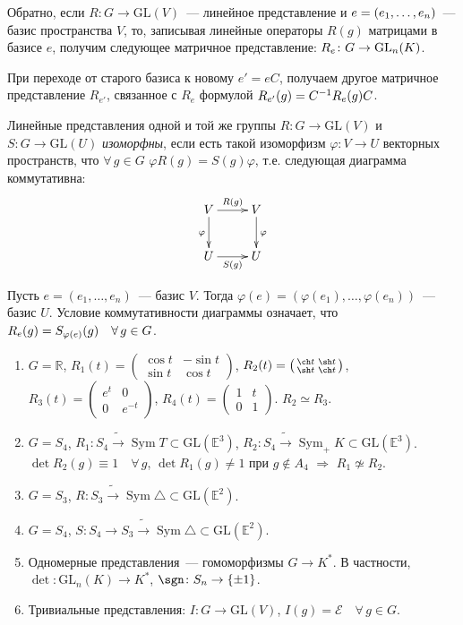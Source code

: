 \documentclass[a4paper]{article}
\newcommand{\Sym}{\mathop{\mathrm{Sym}}\nolimits}
\newcommand*{\p}[1]{#1\nobreak\discretionary{}{\hbox{$\mathsurround=0pt #1$}}{}}
\begin{document}
Обратно, если $R\colon G\to \mathrm{GL}(V)$~--- линейное
представление и $e=(e_1,\p\ldots,e_n)$~--- базис пространства $V$,
то, записывая линейные операторы $R(g)$ матрицами в базисе $e$,
получим следующее матричное представление: $R_e\colon G\p\to
\mathrm{GL}_n(K)$.

При переходе от старого базиса к новому $e'=eC$, получаем другое
матричное представление $R_{e'}$, связанное с $R_e$ формулой
$R_{e'}(g)\p=C^{-1}R_e(g)C$.

Линейные представления одной и той же группы $R\colon G\to
\mathrm{GL}(V)$ и $S\colon G\to \mathrm{GL}(U)$ \emph{изоморфны},
если есть такой изоморфизм $\varphi\colon V\to U$ векторных
пространств, что $\forall \, g\in G$ \quad $\varphi
R(g)=S(g)\varphi$, т.е. следующая диаграмма коммутативна:
$$\xymatrix{
 V \ar[r]^{R(g)} \ar[d]_\varphi & V \ar[d]^\varphi\\
 U \ar[r]_{S(g)} & U}$$

Пусть $e=(e_1,\ldots,e_n)$~--- базис $V$. Тогда
$\varphi(e)=(\varphi(e_1),\ldots,\varphi(e_n))$~--- базис $U$.
Условие коммутативности диаграммы означает, что
$R_e(g)\p=S_{\varphi(e)}(g)\quad \forall \, g\in G$.

\begin{ex}
\begin{enumerate}
  \item $G=\mathbb{R}$, $R_1(t)=\left(\begin{smallmatrix}\cos t& -\sin t\\ \sin t& \cos
  t\end{smallmatrix}\right)$, $R_2(t)=\left(\begin{smallmatrix}\ch t& \sh t\\ \sh t& \ch
  t\end{smallmatrix}\right)$, $R_3(t)=\left(\begin{smallmatrix} e^t& 0\\ 0&
  e^{-t}\end{smallmatrix}\right)$, $R_4(t)=\left(\begin{smallmatrix} 1& t\\ 0 &
  1\end{smallmatrix}\right)$. $R_2\simeq R_3$.
  \item $G=S_4$, $R_1\colon S_4\widetilde{\to}\Sym T\subset
  \mathrm{GL}(\mathbb{E}^3)$, $R_2\colon S_4\widetilde{\to} \Sym_+K\subset
  \mathrm{GL}(\mathbb{E}^3)$. $\det R_2(g)\equiv 1\quad \forall \, g$, $\det
  R_1(g)\neq1$ при $g\not\in A_4$ $\Rightarrow$ $R_1\not\simeq R_2$.
  \item $G=S_3$, $R\colon S_3\widetilde{\to}\Sym\triangle\subset
  \mathrm{GL}(\mathbb{E}^2)$.
  \item $G=S_4$, $S\colon S_4\to S_3\widetilde{\to}\Sym\triangle\subset
  \mathrm{GL}(\mathbb{E}^2)$.
  \item Одномерные представления~--- гомоморфизмы $G\to K^*$. В
  частности, $\det\colon \mathrm{GL}_n(K)\to K^*$, $\sgn\colon S_n\to
  \{\pm1\}$.
  \item Тривиальные представления: $I\colon G\to \mathrm{GL}(V)$, $I(g)=\mathcal{E}\quad \forall \, g\in
  G$.
\end{enumerate}
\end{ex}
\end{document}
